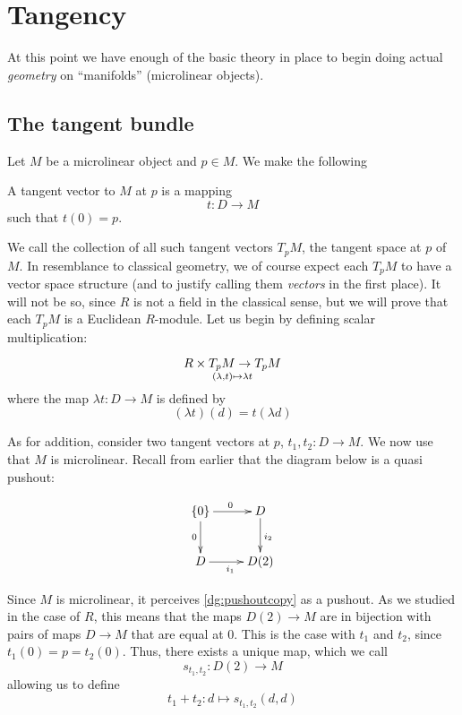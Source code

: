 \chapter{Tangency} \label{sec:tangency}

At this point we have enough of the basic theory in place to begin doing actual \emph{geometry} on ``manifolds'' (microlinear objects).

\section{The tangent bundle}

Let \( M \) be a microlinear object and \( p\in M \). We make the following

\begin{defn}
  A tangent vector to \( M \) at \( p \) is a mapping 
  \begin{equation*}
    t:D\to M
  \end{equation*}
  such that \( t(0)=p \).
\end{defn}

We call the collection of all such tangent vectors \( T_pM \), the tangent space at \( p \) of \( M \). In resemblance to classical geometry, we of course expect each \( T_pM \) to have a vector space structure (and to justify calling them \emph{vectors} in the first place). It will not be so, since \( R \) is not a field in the classical sense, but we will prove that each \( T_pM \) is a Euclidean \( R \)-module. Let us begin by defining scalar multiplication:

\begin{equation*}
  R\times T_pM \to T_pM \atop (\lambda,t)\mapsto \lambda t
\end{equation*}
where the map \( \lambda t: D\to M \) is defined by
\begin{equation*}
  (\lambda t)(d) = t(\lambda d)
\end{equation*}

As for addition, consider two tangent vectors at \( p \), \( t_1,t_2:D\to M \). We now use that \( M \) is microlinear. Recall from earlier that the diagram below is a quasi pushout:

\begin{equation}
  \xymatrix{
    {\{0\}} \ar[d]_0 \ar[r]^0   & D \ar[d]^{i_2} \\
    D \ar[r]_{i_1}              & D(2)
  }
  \label{dg:pushoutcopy}
\end{equation}

Since \( M \) is microlinear, it perceives \ref{dg:pushoutcopy} as a pushout. As we studied in the case of \( R \), this means that the maps \( D(2)\to M \) are in bijection with pairs of maps \( D\to M \) that are equal at \( 0 \). This is the case with \( t_1 \) and \( t_2 \), since \( t_1(0)=p=t_2(0) \). Thus, there exists a unique map, which we call
\begin{equation*}
  s_{t_1,t_2}:D(2)\to M
\end{equation*}
allowing us to define
\begin{equation*}
  t_1+t_2:d\mapsto s_{t_1,t_2}(d,d)
\end{equation*}

